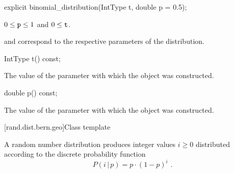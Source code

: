 %
\begin{itemdecl}
explicit binomial_distribution(IntType t, double p = 0.5);
\end{itemdecl}

\begin{itemdescr}
\pnum
\expects
$0 \leq \texttt{p} \leq 1$ and $0 \leq \texttt{t} $.

\pnum
\remarks
  and 
 correspond to the respective parameters of the distribution.
\end{itemdescr}

%
\begin{itemdecl}
IntType t() const;
\end{itemdecl}%
\begin{itemdescr}
\pnum
\returns
The value of the  parameter
 with which the object was constructed.
\end{itemdescr}

%
\begin{itemdecl}
double p() const;
\end{itemdecl}

\begin{itemdescr}
\pnum
\returns
The value of the  parameter
 with which the object was constructed.
\end{itemdescr}


[rand.dist.bern.geo]{Class template }
%
%

\pnum
A  random number distribution
produces integer values $i \geq 0$
distributed according to
the discrete probability function
%
%
\[ P(i\,|\,p) = p \cdot (1-p)^{i} \text{ .} \]

